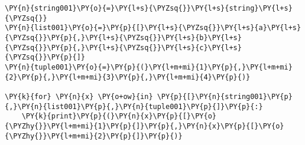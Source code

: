 \begin{Verbatim}[commandchars=\\\{\}]
\PY{n}{string001}\PY{o}{=}\PY{l+s}{\PYZsq{}}\PY{l+s}{string}\PY{l+s}{\PYZsq{}}
\PY{n}{list001}\PY{o}{=}\PY{p}{[}\PY{l+s}{\PYZsq{}}\PY{l+s}{a}\PY{l+s}{\PYZsq{}}\PY{p}{,}\PY{l+s}{\PYZsq{}}\PY{l+s}{b}\PY{l+s}{\PYZsq{}}\PY{p}{,}\PY{l+s}{\PYZsq{}}\PY{l+s}{c}\PY{l+s}{\PYZsq{}}\PY{p}{]}
\PY{n}{tuple001}\PY{o}{=}\PY{p}{(}\PY{l+m+mi}{1}\PY{p}{,}\PY{l+m+mi}{2}\PY{p}{,}\PY{l+m+mi}{3}\PY{p}{,}\PY{l+m+mi}{4}\PY{p}{)}

\PY{k}{for} \PY{n}{x} \PY{o+ow}{in} \PY{p}{[}\PY{n}{string001}\PY{p}{,}\PY{n}{list001}\PY{p}{,}\PY{n}{tuple001}\PY{p}{]}\PY{p}{:}
    \PY{k}{print}\PY{p}{(}\PY{n}{x}\PY{p}{[}\PY{o}{\PYZhy{}}\PY{l+m+mi}{1}\PY{p}{]}\PY{p}{,}\PY{n}{x}\PY{p}{[}\PY{o}{\PYZhy{}}\PY{l+m+mi}{2}\PY{p}{]}\PY{p}{)}
\end{Verbatim}
